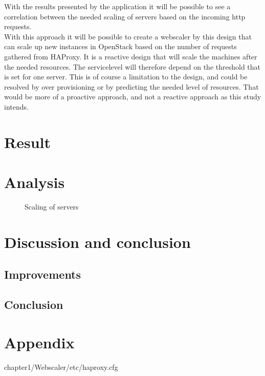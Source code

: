 

With the results presented by the application it will be possible to see a
correlation between the needed scaling of servers based on the incoming http
requests.\\

With this approach it will be possible to create a webscaler by this design
that can scale up new instances in OpenStack based on the number of requests
gathered from HAProxy. It is a reactive design that will scale the machines
after the needed resources. The servicelevel will therefore depend on the
threshold that is set for one server. This is of course a limitation to the
design, and could be resolved by over provisioning or by predicting the needed
level of resources. That would be more of a proactive approach, and not a
reactive approach as this study intends.

\section{Result}

\section{Analysis}
\begin{figure}[htp]
\centering
{}
\caption{\label{fig:server_scaling}Scaling of servers}
\end{figure}

\section{Discussion and conclusion}
\subsection{Improvements}

\subsection{Conclusion}

\section{Appendix}

{chapter1/Webscaler/etc/haproxy.cfg}
